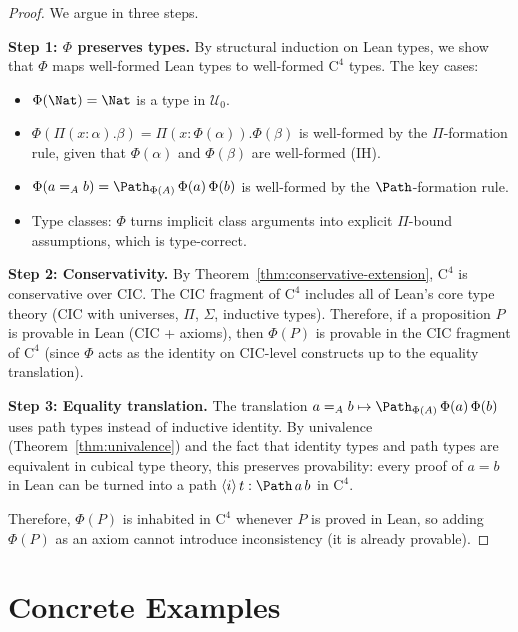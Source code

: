 \begin{proof}
We argue in three steps.

\textbf{Step 1: $\Phi$ preserves types.}
By structural induction on Lean types, we show that $\Phi$ maps
well-formed Lean types to well-formed $\mathrm{C}^4$ types.  The key
cases:
\begin{itemize}
\item $\Phi(\Nat) = \Nat$ is a type in $\mathcal{U}_0$.
\item $\Phi(\Pi(x:\alpha).\beta) = \Pi(x:\Phi(\alpha)).\Phi(\beta)$
  is well-formed by the $\Pi$-formation rule, given that
  $\Phi(\alpha)$ and $\Phi(\beta)$ are well-formed (IH).
\item $\Phi(a =_A b) = \Path_{\Phi(A)}\,\Phi(a)\,\Phi(b)$ is
  well-formed by the $\Path$-formation rule.
\item Type classes: $\Phi$ turns implicit class arguments into
  explicit $\Pi$-bound assumptions, which is type-correct.
\end{itemize}

\textbf{Step 2: Conservativity.}
By Theorem~\ref{thm:conservative-extension}, $\mathrm{C}^4$ is
conservative over CIC.  The CIC fragment of $\mathrm{C}^4$ includes
all of Lean's core type theory (CIC with universes, $\Pi$, $\Sigma$,
inductive types).  Therefore, if a proposition $P$ is provable in
Lean (CIC + axioms), then $\Phi(P)$ is provable in the CIC fragment
of $\mathrm{C}^4$ (since $\Phi$ acts as the identity on CIC-level
constructs up to the equality translation).

\textbf{Step 3: Equality translation.}
The translation $a =_A b \mapsto \Path_{\Phi(A)}\,\Phi(a)\,\Phi(b)$
uses path types instead of inductive identity.  By univalence
(Theorem~\ref{thm:univalence}) and the fact that identity types and
path types are equivalent in cubical type theory, this preserves
provability: every proof of $a = b$ in Lean can be turned into a
path $\langle i \rangle\, t : \Path\,a\,b$ in $\mathrm{C}^4$.

Therefore, $\Phi(P)$ is inhabited in $\mathrm{C}^4$ whenever $P$
is proved in Lean, so adding $\Phi(P)$ as an axiom cannot introduce
inconsistency (it is already provable).
\end{proof}


\section{Concrete Examples}
\label{sec:concrete-examples}

